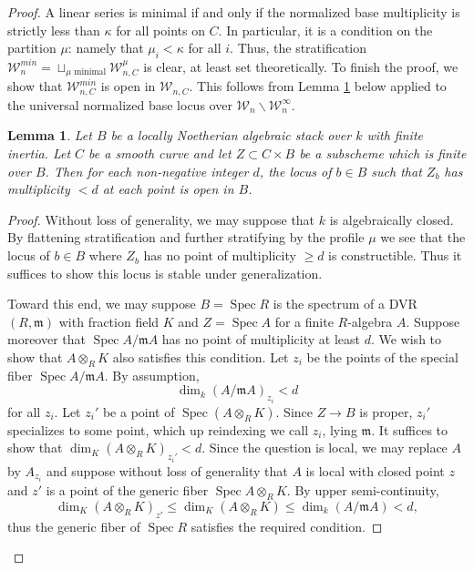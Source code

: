 \documentclass[a4paper,12pt]{amsart}
\newtheorem{lem}[thm]{Lemma}
\theoremstyle{definition}
\newcommand{\cW}{\mathcal{W}}
\DeclareMathOperator{\Spec}{Spec}
\renewcommand{\setminus}{\smallsetminus}
\begin{document}
	\begin{proof}
		
		A linear series is minimal if and only if the normalized base multiplicity is strictly less than $\kappa$ for all points on $C$. In particular, it is a condition on the partition $\mu$: namely that $\mu_i < \kappa$ for all $i$. Thus, the stratification $\cW^{min}_n = \sqcup_{\mu \text{ minimal}} \cW^\mu_{n,C}$ is clear, at least set theoretically. To finish the proof, we show that $\cW^{min}_{n,C}$ is open in $\cW_{n,C}$. This follows from Lemma \ref{lem:open} below applied to the universal normalized base locus over $\cW_n \setminus \cW^{\infty}_n$. 
		
		
		\begin{lem}\label{lem:open} Let $B$ be a locally Noetherian algebraic stack over $k$ with finite inertia. Let $C$ be a smooth curve and let $Z \subset C \times B$ be a subscheme which is finite over $B$. Then for each non-negative integer $d$, the locus of $b \in B$ such that $Z_b$ has multiplicity $ < d$ at each point is open in $B$. 
		\end{lem}
		\begin{proof} Without loss of generality, we may suppose that $k$ is algebraically closed. By flattening stratification and further stratifying by the profile $\mu$ we see that the locus of $b \in B$ where $Z_{b}$ has no point of multiplicity $\geq d$ is constructible. Thus it suffices to show this locus is stable under generalization.   
			
			Toward this end, we may suppose $B = \Spec R$ is the spectrum of a DVR $(R,\mathfrak{m})$ with fraction field $K$ and $Z = \Spec A$ for a finite $R$-algebra $A$. Suppose moreover that $\Spec A/\mathfrak{m}A$ has no point of multiplicity at least $d$. We wish to show that $A \otimes_R K$ also satisfies this condition. Let $z_i$ be the points of the special fiber $\Spec A/\mathfrak{m}A$. By assumption,
			$$
			\dim_{k} (A/\mathfrak{m}A)_{z_i} < d
			$$
			for all $z_i$. Let $z_i'$ be a point of $\Spec(A \otimes_R K)$. Since $Z \to B$ is proper, $z_i'$ specializes to some point, which up reindexing we call $z_i$, lying $\mathfrak{m}$. It suffices to show that $\dim_K (A \otimes_R K)_{z_i'} < d$. Since the question is local, we may replace $A$ by $A_{z_i}$ and suppose without loss of generality that $A$ is local with closed point $z$ and $z'$ is a point of the generic fiber $\Spec A \otimes_R K$. By upper semi-continuity, 
			$$
			\dim_K (A\otimes_R K)_{z'} \le \dim_K(A \otimes_R K) \le \dim_{k} (A/\mathfrak{m}A) < d,
			$$
			thus the generic fiber of $\Spec R$ satisfies the required condition. 
		\end{proof} 
	\end{proof}
	
\end{document}
